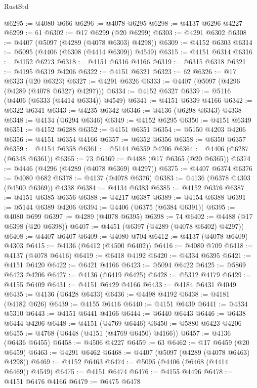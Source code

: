 \begin{lexlean}{RustStd}
\begin{coremodule}
@6295 := @4080 @666
@6296 := @4078 @6295
@6298 := @4137 @6296 @4227
@6299 := 61
@6302 := @17 @6299 (@20 @6299)
@6303 := @4291 @6302
@6308 := @4407 (@5097 (@4289 (@4078 @6303) @4298))
@6309 := @4152 @6303
@6314 := @5095 (@4406 (@6308 (@4414 @6309)) @4549)
@6315 := @4151 @6314
@6316 := @4152 @6273
@6318 := @4151 @6316 @4166
@6319 := @6315 @6318
@6321 := @4195 @6319 @4206
@6322 := @4151 @6321
@6323 := 62
@6326 := @17 @6323 (@20 @6323)
@6327 := @4291 @6326
@6333 := @4407 (@5097 (@4296 (@4289 (@4078 @6327) @4297)))
@6334 := @4152 @6327
@6339 := @5116 (@4406 (@6333 (@4414 @6334)) @4549)
@6341 := @4151 @6339 @4166
@6342 := @6322 @6341
@6343 := @4235 @6342
@6346 := @4136 (@6298 @6343) @4338
@6348 := @4134 (@6294 @6346)
@6349 := @4152 @6295
@6350 := @4151 @6349
@6351 := @4152 @6288
@6352 := @4151 @6351
@6354 := @5150 @4203 @4206
@6356 := @4151 @6354 @4166
@6357 := @6352 @6356
@6358 := @6350 @6357
@6359 := @4154 @6358
@6361 := @5144 @6359 @4206
@6364 := @4406 (@6287 (@6348 @6361))
@6365 := 73
@6369 := @4488 (@17 @6365 (@20 @6365))
@6374 := @4446 (@4296 (@4289 (@4078 @6369) @4297))
@6375 := @4407 @6374
@6376 := @4080 @682
@6378 := @4137 (@4078 @6376)
@6383 := @4136 (@6378 @4303 (@4500 @6369)) @4338
@6384 := @4134 @6383
@6385 := @4152 @6376
@6387 := @4151 @6385 @6356
@6388 := @4217 @6387
@6389 := @4154 @6388
@6391 := @5144 @6389 @4206
@6394 := @4406 (@6375 (@6384 @6391))
@6395 := @4080 @699
@6397 := @4289 (@4078 @6395)
@6398 := 74
@6402 := @4488 (@17 @6398 (@20 @6398))
@6407 := @4451 (@6397 (@4289 (@4078 @6402) @4297))
@6408 := @4407 @6407
@6409 := @4080 @704
@6412 := @4137 (@4078 @6409) @4303
@6415 := @4136 (@6412 (@4500 @6402))
@6416 := @4080 @709
@6418 := @4137 (@4078 @6416)
@6419 := @6418 @4192
@6420 := @4334 @6395
@6421 := @4151 @6420
@6422 := @6421 @4166
@6423 := @5094 @6422
@6425 := @5869 @6423 @4206
@6427 := @4136 (@6419 @6425)
@6428 := @5312 @4179
@6429 := @4155 @6409
@6431 := @4151 @6429 @4166
@6433 := @4184 @6431 @4049
@6435 := @4136 (@6428 @6433)
@6436 := @4498 @4192
@6438 := @4181 (@4182 @626)
@6439 := @4155 @6416
@6440 := @4151 @6439
@6441 := @4334 @5310
@6443 := @4151 @6441 @4166
@6444 := @6440 @6443
@6446 := @6438 @6444 @4206
@6448 := @4151 (@4769 @6446)
@6450 := @5880 @6423 @4206
@6455 := @4768 (@6448 (@4151 (@4769 @6450) @4166))
@6457 := @4136 (@6436 @6455)
@6458 := @4506 @4227
@6459 := 63
@6462 := @17 @6459 (@20 @6459)
@6463 := @4291 @6462
@6468 := @4407 (@5097 (@4289 (@4078 @6463) @4298))
@6469 := @4152 @6463
@6474 := @5095 (@4406 (@6468 (@4414 @6469)) @4549)
@6475 := @4151 @6474
@6476 := @4155 @4496
@6478 := @4151 @6476 @4166
@6479 := @6475 @6478

\end{coremodule}
\end{lexlean}
